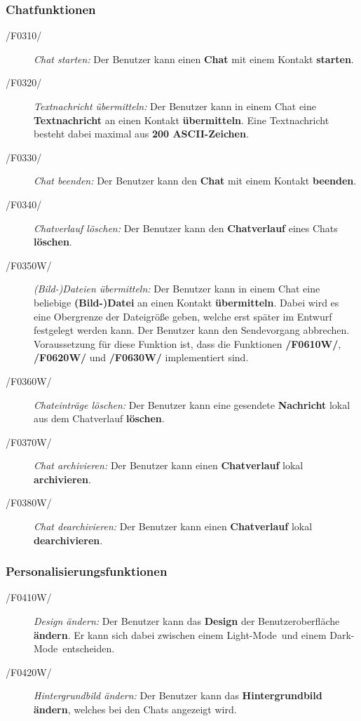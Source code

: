\subsubsection{Chatfunktionen}
	\begin{description}
		\item[/F0310/]
			\textit{Chat starten:}
			Der Benutzer kann einen \textbf{Chat} mit einem Kontakt \textbf{starten}. 
		\item[/F0320/]
			\textit{Textnachricht übermitteln:} 
			Der Benutzer kann in einem Chat eine \textbf{Textnachricht} an einen Kontakt \textbf{übermitteln}.
			Eine Textnachricht besteht dabei maximal aus \textbf{200 ASCII-Zeichen}.
		\item[/F0330/]
			\textit{Chat beenden:}
			Der Benutzer kann den \textbf{Chat} mit einem Kontakt \textbf{beenden}. 
		\item[/F0340/]
			\textit{Chatverlauf löschen:}
			Der Benutzer kann den \textbf{Chatverlauf} eines Chats \textbf{löschen}.
		\item[/F0350W/]
			\textit{(Bild-)Dateien übermitteln:}
			Der Benutzer kann in einem Chat eine beliebige \textbf{(Bild-)Datei} an einen Kontakt \textbf{übermitteln}. 
			Dabei wird es eine Obergrenze der Dateigröße geben, welche erst später im Entwurf festgelegt werden kann.
			Der Benutzer kann den Sendevorgang abbrechen.\\
			Voraussetzung für diese Funktion ist, dass die Funktionen \textbf{/F0610W/}, \textbf{/F0620W/} und \textbf{/F0630W/} implementiert sind.
		\item[/F0360W/]
			\textit{Chateinträge löschen:}
			Der Benutzer kann eine gesendete \textbf{Nachricht} lokal aus dem Chatverlauf \textbf{löschen}.
		\item[/F0370W/]
			\textit{Chat archivieren:}
				Der Benutzer kann einen \textbf{Chatverlauf} lokal \textbf{archivieren}.
		\item[/F0380W/]
			\textit{Chat dearchivieren:}
				Der Benutzer kann einen \textbf{Chatverlauf} lokal \textbf{dearchivieren}.			
	\end{description}

\subsubsection{Personalisierungsfunktionen}
	\begin{description}
		\item[/F0410W/]
			\textit{Design ändern:}
				Der Benutzer kann das \textbf{Design} der Benutzeroberfläche \textbf{ändern}.
				Er kann sich dabei zwischen einem  \glqq  Light-Mode\grqq   $\,$ und einem  \glqq Dark-Mode\grqq $\,$ entscheiden.
		\item[/F0420W/]
			\textit{Hintergrundbild ändern:}
			Der Benutzer kann das \textbf{Hintergrundbild ändern}, welches bei den Chats angezeigt wird.
	\end{description}
	
